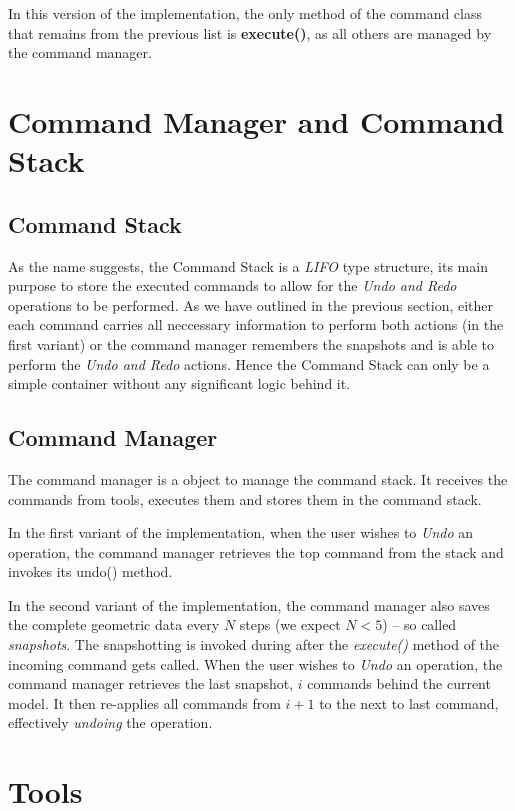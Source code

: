 In this version of the implementation, the only method of the command class that remains from the previous list is \textbf{execute()}, as all others are managed by the command manager.

\section{Command Manager and Command Stack}

\subsection{Command Stack}

As the name suggests, the Command Stack is a \textit{LIFO} type structure, its main purpose to store the executed commands to allow for the \textit{Undo and Redo} operations to be performed. As we have outlined in the previous section, either each command carries all neccessary information to perform both actions (in the first variant) or the command manager remembers the snapshots and is able to perform the \textit{Undo and Redo} actions. Hence the Command Stack can only be a simple container without any significant logic behind it.

\subsection{Command Manager}

The command manager is a object to manage the command stack. It receives the commands from tools, executes them and stores them in the command stack.

In the first variant of the implementation, when the user wishes to \textit{Undo} an operation, the command manager retrieves the top command from the stack and invokes its undo() method.

In the second variant of the implementation, the command manager also saves the complete geometric data every $N$ steps (we expect $N < 5$) -- so called \textit{snapshots}. The snapshotting is invoked during after the \textit{execute()} method of the incoming command gets called. When the user wishes to \textit{Undo} an operation, the command manager retrieves the last snapshot, $i$ commands behind the current model. It then re-applies all commands from $i+1$ to the next to last command, effectively \textit{undoing} the operation.

\section{Tools}


